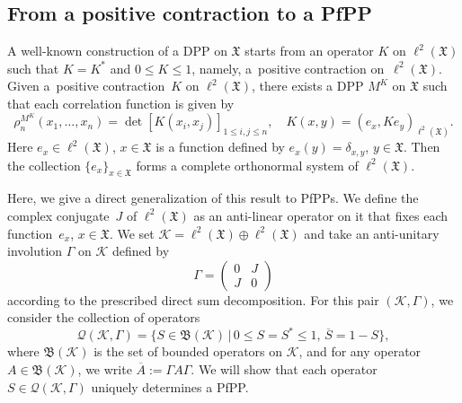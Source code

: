 \documentclass[pdftex]{sigma}
\numberwithin{equation}{section}
\newcommand{\mfrak}[1]{\mathfrak{#1}}
\newcommand{\mcal}[1]{\mathcal{#1}}
\begin{document}
\subsection{From a positive contraction to a PfPP}
A well-known construction of a DPP on $\mfrak{X}$ \cite{Soshnikov2000} starts from an operator $K$ on $\ell^{2}(\mfrak{X})$ such that $K=K^{\ast}$ and $0\le K\le 1$, namely, a~positive contraction on~$\ell^{2}(\mfrak{X})$. Given a~positive contraction~$K$ on $\ell^{2}(\mfrak{X})$, there exists a DPP $M^{K}$ on $\mfrak{X}$ such that each correlation function is given by
\begin{equation*}
	\rho^{M^{K}}_{n}(x_{1},\dots, x_{n})=\det [K(x_{i},x_{j}) ]_{1\le i,j\le n},\quad K(x,y)=(e_{x},Ke_{y})_{\ell^{2}(\mfrak{X})}.
\end{equation*}
Here $e_{x}\in \ell^{2}(\mfrak{X})$, $x\in\mfrak{X}$ is a function defined by $e_{x}(y)=\delta_{x,y}$, $y\in\mfrak{X}$. Then the collection $\{e_{x}\}_{x\in\mfrak{X}}$ forms a complete orthonormal system of $\ell^{2}(\mfrak{X})$.

Here, we give a direct generalization of this result to PfPPs.
We define the complex conjugate~$J$ of $\ell^{2}(\mfrak{X})$ as an anti-linear operator on it that fixes each function~$e_{x}$, $x\in\mfrak{X}$.
We set $\mcal{K}=\ell^{2}(\mfrak{X})\oplus \ell^{2}(\mfrak{X})$ and take an anti-unitary involution $\Gamma$ on $\mcal{K}$ defined by
\begin{equation}
\label{eq:Gamma}
	\Gamma=\left(
	\begin{matrix}
	0 & J \\
	J & 0
	\end{matrix}
	\right)
\end{equation}
according to the prescribed direct sum decomposition.
For this pair $(\mcal{K},\Gamma)$, we consider the collection of operators
\begin{equation}
\label{eq:collection_covariance_ops}
	\mcal{Q}(\mcal{K},\Gamma)=\big\{S\in\mfrak{B}(\mcal{K})\,|\,0\le S=S^{\ast}\le 1,\, \overline{S}=1-S\big\},
\end{equation}
where $\mfrak{B}(\mcal{K})$ is the set of bounded operators on $\mcal{K}$, and for any operator $A\in\mfrak{B}(\mcal{K})$, we write $\overline{A}:=\Gamma A\Gamma$.
We will show that each operator $S\in\mcal{Q}(\mcal{K},\Gamma)$ uniquely determines a PfPP.
\end{document}
